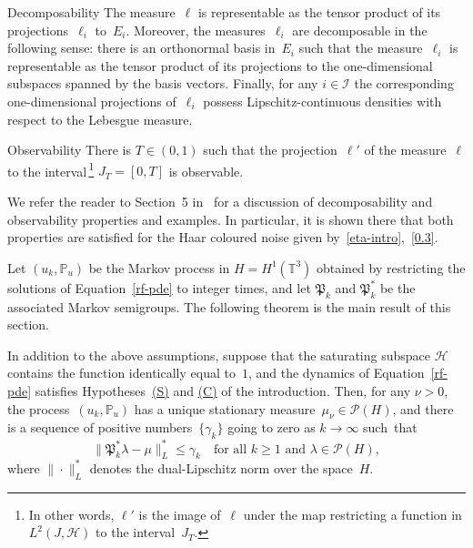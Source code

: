 \documentclass[JEP,XML,SOM,Unicode,ThmDefs]{cedram}
\let\mathcal\mathscr
\theoremstyle{plain}
\numberwithin{equation}{section}
\newcommand{\IP}{{\mathbb P}}
\newcommand{\T}{{\mathbb T}}
\newcommand{\HH}{{\mathcal H}}
\newcommand{\II}{{\mathcal I}}
\newcommand{\PP}{{\mathcal P}}
\newcommand{\PPPP}{{\mathfrak P}}
\begin{document}
\begin{enonce*}{Decomposability}
The measure~$\ell$ is representable as the tensor product of its projections~$\ell_i$ to~$E_i$. Moreover, the measures~$\ell_i$ are decomposable in the following sense: there is an orthonormal basis in~$E_i$ such that the measure~$\ell_i$ is representable as the tensor product of its projections to the one-dimensional subspaces spanned by the basis vectors. Finally, for any $i\in\II$ the corresponding one-dimensional projections of~$\ell_i$ possess Lipschitz-continuous densities with respect to the Lebesgue measure.
\end{enonce*}
\begin{enonce*}{Observability}
There is $T\in(0,1)$ such that the projection~$\ell'$ of the measure~$\ell$ to the interval\,\footnote{In other words, $\ell'$ is the image of~$\ell$ under the map restricting a function in $L^2(J,\HH)$ to the interval~$J_T$.} $J_T=[0,T]$ is observable.
\end{enonce*}

We refer the reader to Section~5 in~\cite{KNS-2020} for a discussion of decomposability and observability properties and examples. In particular, it is shown there that both properties are satisfied for the Haar coloured noise given by~\eqref{eta-intro},~\eqref{0.3}.

Let $(u_k, \IP_u)$ be the Markov process in $H=H^1(\T^3)$ obtained by restricting the solutions of Equation~\eqref{rf-pde} to integer times, and let $\PPPP_k$ and $\PPPP_k^*$ be the associated Markov semigroups. The following theorem is the main result of this section.

\begin{theorem} \label{T:4.3}
In addition to the above assumptions, suppose that the saturating subspace $\HH$ contains the function identically equal to~$1$, and the dynamics of Equation~\eqref{rf-pde} satisfies Hypotheses~\hyperlink{S}{\rm(S)} and \hyperlink{C}{\rm(C)} of the introduction. Then, for any $\nu>0$, the process~$(u_k,\IP_u)$ has a unique stationary measure~$\mu_\nu\in\PP(H)$,
and there is a sequence of positive numbers~$\{\gamma_k\}$ going to zero as $k\to\infty$ such~that
\begin{equation} \label{uniform-convergence}
\|\PPPP_k^*\lambda-\mu\|_L^*\le \gamma_k\quad\text{for all $k\ge1$ and $\lambda\in\PP(H)$},
\end{equation}
where $\|\cdot\|_L^*$ denotes the dual-Lipschitz norm over the space~$H$.
\end{theorem}
\end{document}
